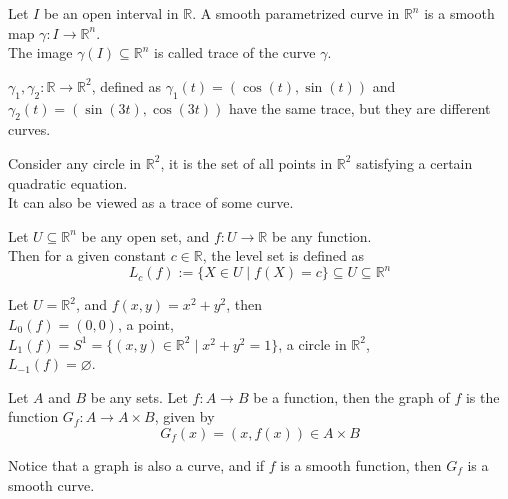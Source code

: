 
\begin{definition}[Curves]
    Let $I$ be an open interval in $\mathbb{R}$. A smooth parametrized curve in $\mathbb{R}^n$ is a smooth map $\gamma:I\to\mathbb{R}^n$.\\
    The image $\gamma(I)\subseteq\mathbb{R}^n$ is called trace of the curve $\gamma$.
\end{definition}
\vspace{0.4cm}
\begin{eg}
    $\gamma_1,\gamma_2:\mathbb{R}\to\mathbb{R}^2$, defined as $\gamma_1(t)=(\cos(t),\sin(t))$ and $\gamma_2(t)=(\sin(3t),\cos(3t))$ have the same trace, but they are different curves.
\end{eg}
\vspace{0.4cm}
\begin{observe}
    Consider any circle in $\mathbb{R}^2$, it is the set of all points in $\mathbb{R}^2$ satisfying a certain quadratic equation.\\
    It can also be viewed as a trace of some curve.
\end{observe}
\vspace{0.4cm}
\begin{definition}
    Let $U\subseteq\mathbb{R}^n$ be any open set, and $f:U\to\mathbb{R}$ be any function.\\
    Then for a given constant $c\in\mathbb{R}$, the level set is defined as$$L_{c}(f):=\{X \in U \mid f(X)=c\} \subseteq U \subseteq\mathbb{R}^n$$
\end{definition}
\vspace{0.4cm}
\begin{eg}
    Let $U=\mathbb{R}^2$, and $f(x,y)=x^2+y^2$, then\\ 
    $L_{0}(f)={(0,0)}$, a point,\\
    $L_{1}(f)=S^{1}=\{(x,y)\in\mathbb{R}^2\mid x^2+y^2=1\}$, a circle in $\mathbb{R}^2$,\\
    $L_{-1}(f)=\varnothing$.
\end{eg}
\vspace{0.4cm}
\begin{definition}[Graph]
    Let $A$ and $B$ be any sets. Let $f:A\to B$ be a function, then the graph of $f$ is the function $G_{f}:A\to A\times B$, given by$$G_f(x)=(x,f(x))\in A\times B$$
\end{definition}
\vspace{0.4cm}
\begin{note}
    Notice that a graph is also a curve, and if $f$ is a smooth function, then $G_f$ is a smooth curve.
\end{note}
